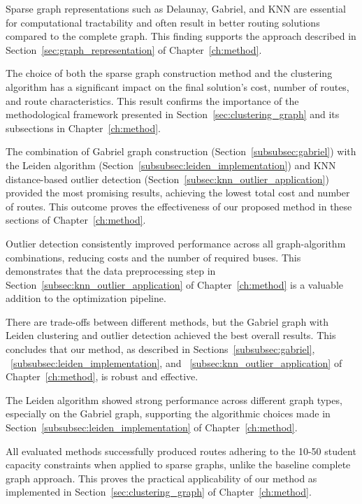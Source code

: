 Sparse graph representations such as Delaunay, Gabriel, and KNN are essential for computational tractability and often result in better routing solutions compared to the complete graph. This finding supports the approach described in Section~\ref{sec:graph_representation} of Chapter~\ref{ch:method}.

The choice of both the sparse graph construction method and the clustering algorithm has a significant impact on the final solution's cost, number of routes, and route characteristics. This result confirms the importance of the methodological framework presented in Section~\ref{sec:clustering_graph} and its subsections in Chapter~\ref{ch:method}.

The combination of Gabriel graph construction (Section~\ref{subsubsec:gabriel}) with the Leiden algorithm (Section~\ref{subsubsec:leiden_implementation}) and KNN distance-based outlier detection (Section~\ref{subsec:knn_outlier_application}) provided the most promising results, achieving the lowest total cost and number of routes. This outcome proves the effectiveness of our proposed method in these sections of Chapter~\ref{ch:method}.

Outlier detection consistently improved performance across all graph-algorithm combinations, reducing costs and the number of required buses. This demonstrates that the data preprocessing step in Section~\ref{subsec:knn_outlier_application} of Chapter~\ref{ch:method} is a valuable addition to the optimization pipeline.

There are trade-offs between different methods, but the Gabriel graph with Leiden clustering and outlier detection achieved the best overall results. This concludes that our method, as described in Sections~\ref{subsubsec:gabriel}, ~\ref{subsubsec:leiden_implementation}, and ~\ref{subsec:knn_outlier_application} of Chapter~\ref{ch:method}, is robust and effective.

The Leiden algorithm showed strong performance across different graph types, especially on the Gabriel graph, supporting the algorithmic choices made in Section~\ref{subsubsec:leiden_implementation} of Chapter~\ref{ch:method}.

All evaluated methods successfully produced routes adhering to the 10-50 student capacity constraints when applied to sparse graphs, unlike the baseline complete graph approach. This proves the practical applicability of our method as implemented in Section~\ref{sec:clustering_graph} of Chapter~\ref{ch:method}.

